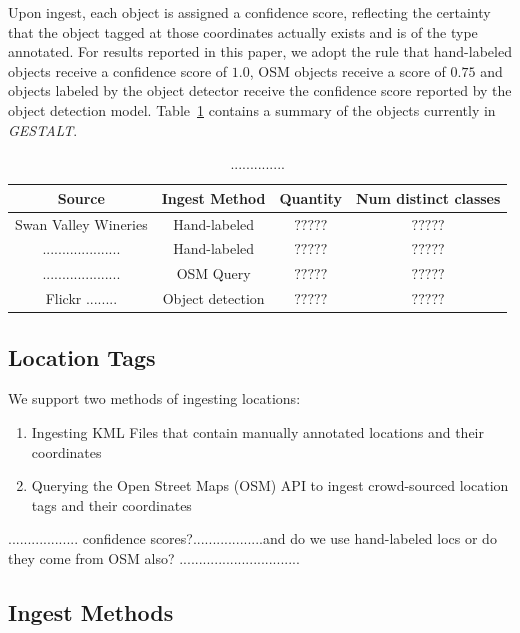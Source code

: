 Upon ingest, each object is assigned a confidence score, reflecting the certainty that the object tagged at those coordinates actually exists and is of the type annotated. 
For results reported in this paper, we adopt the rule that hand-labeled objects receive a confidence score of $1.0$, OSM objects receive a score of $0.75$ and objects labeled by the object detector receive the confidence score reported by the object detection model. Table~\ref{table:objects} contains a summary of the objects currently in \emph{GESTALT}.


\begin{table}[h!]
	\begin{center}
		\begin{tabular}{ |c|c|c|c| } 
			\hline
			 Source & Ingest Method & Quantity & Num distinct classes  \\
			\hline
                Swan Valley Wineries & Hand-labeled & $?????$ & $?????$ \\ 
			.................... & Hand-labeled & $?????$ & $?????$  \\ 
                .................... & OSM Query & $?????$ & $?????$ \\ 
			Flickr ........ & Object detection & $?????$ & $?????$  \\ 
			\hline
		\end{tabular}	
		\caption{..............}
            \label{table:objects}
	\end{center}
\end{table} 

\subsection{Location Tags}
We support two methods of ingesting locations:
\begin{enumerate}
    \item Ingesting KML Files that contain manually annotated locations and their coordinates 
    \item Querying the Open Street Maps (OSM) API to ingest crowd-sourced location tags and their coordinates 
\end{enumerate}

.................. confidence scores?..................and do we use hand-labeled locs or do they come from OSM also? ...............................

\subsection{Ingest Methods}
